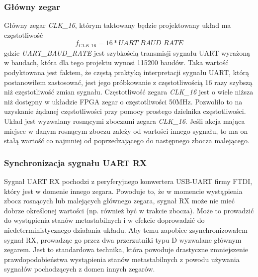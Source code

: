 \subsubsection{Główny zegar}
Główny zegar \textit{CLK\_16}, którym taktowany będzie projektowany układ ma częstotliwość
\begin{equation}
f_{CLK\_16} = 16 * UART\_BAUD\_RATE
\end{equation}
gdzie \textit{UART\_BAUD\_RATE} jest szybkością transmisji sygnału UART wyrażoną w baudach, która dla tego projektu wynosi 115200 baudów. Taka wartość podyktowana jest faktem, że częstą praktyką interpretacji sygnału UART, którą postanowiłem zastosować, jest jego próbkowanie z częstotliwością 16 razy szybszą niż częstotliwość zmian sygnału.
\break
Częstotliwość zegara \textit{CLK\_16} jest o wiele niższa niż dostępny w układzie FPGA zegar o częstotliwości 50MHz. Pozwoliło to na uzyskanie żądanej częstotliwości przy pomocy prostego dzielnika częstotliwości.
\break
Układ jest wyzwalany rosnącymi zboczami zegara \textit{CLK\_16}. Jeśli akcja mająca miejsce w danym rosnącym zboczu zależy od wartości innego sygnału, to ma on stałą wartość co najmniej od poprzedzającego do następnego zbocza malejącego.


\subsubsection{Synchronizacja sygnału UART RX}
Sygnał UART RX pochodzi z peryferyjnego konwertera USB-UART firmy FTDI, który jest w domenie innego zegara. Powoduje to, że w momencie wystąpienia zbocz rosnących lub malejących głównego zegara, sygnał RX może nie mieć dobrze określonej wartości (np. również być w trakcie zbocza). Może to prowadzić do wystąpienia stanów metastabilnych \cite{altera-metastability} i w efekcie doprowadzić do niedeterministycznego działania układu. Aby temu zapobiec zsynchronizowałem sygnał RX, prowadząc go przez dwa przerzutniki typu D \cite{altera-metastability, 2ff-synchronization} wyzwalane głównym zegarem. Jest to standardowa technika, która powoduje drastyczne zmniejszenie prawdopodobieństwa wystąpienia stanów metastabilnych z powodu używania sygnałów pochodzących z domen innych zegarów.








\newpage